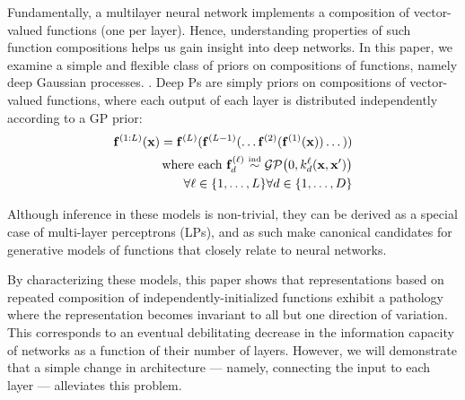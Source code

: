 \documentclass[twoside]{article}
\makeatletter
\newlength{\nonHumbleHeight}
\def\@humbleformat#1{{\settoheight{\nonHumbleHeight}{#1}\resizebox{!}{0.94\nonHumbleHeight}{#1}}}%
\def\humble#1{\@humbleformat{#1}}%
\newcommand{\gp}{{\humble GP}}
\newcommand{\MLP}{{\humble MLP}}
\makeatother
\begin{document}
Fundamentally, a multilayer neural network implements a composition of vector-valued functions (one per layer). Hence, understanding properties of such function compositions helps us gain insight into deep networks. In this paper, we examine a simple and flexible class of priors on compositions of functions, namely deep Gaussian processes. \citep{damianou2012deep}.  Deep \gp{}s are simply priors on compositions of vector-valued functions, where each output of each layer is distributed independently according to a GP prior:
%
\begin{align}
\vf^{(1:L)}(\vx) = \vf^{(L)}(\vf^{(L-1)}(\dots \vf^{(2)}(\vf^{(1)}(\vx)) \dots)) \\ 
\textnormal{ where each $\vf_d^{(\ell)} \simind \GPt{0}{k^\ell_d(\vx, \vx')}$} \\ \forall \ell \in \{1, \dots, L\} \forall d \in \{ 1, \dots, D \} \nonumber
\end{align}

Although inference in these models is non-trivial, they can be derived as a special case of multi-layer perceptrons (\MLP{}s), and as such make canonical candidates for generative models of functions that closely relate to neural networks.

By characterizing these models, this paper shows that representations based on repeated composition of independently-initialized functions exhibit a pathology where the representation becomes invariant to all but one direction of variation. This corresponds to an eventual debilitating decrease in the information capacity of networks as a function of their number of layers. However, we will demonstrate that a simple change in architecture --- namely, connecting the input to each layer --- alleviates this problem. 


\end{document}
